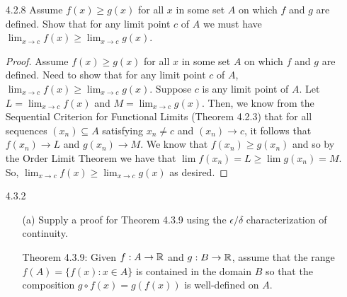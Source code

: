 \documentclass[12pt,letterpaper]{article}
\begin{document}
\begin{itemize}[leftmargin=!,labelindent=5pt]
\begin{itemize}
                    An example of such a limit would be $f(x) = x$ because $\lim_{x\to\infty} x = \infty$.

                    \begin{proof}
                        Suppose $N > 0$.
                        Need that there exists a $D > 0$ such that whenever $x \in A$ and $x > D$, it follows that $f(x) = x > N$.
                        Choose $D = N$.
                        Then, whenever $x \in A$ and $x > D$, it follows that $x > N$ as desired.
                    \end{proof}
            \end{itemize}
        \item [4.2.8] Assume $f(x) \geq g(x)$ for all $x$ in some set $A$ on which $f$ and $g$ are defined. Show that for any limit point $c$ of $A$ we must have $\lim_{x \to c} f(x) \geq \lim_{x \to c} g(x)$.
            \begin{proof}
                Assume $f(x) \geq g(x)$ for all $x$ in some set $A$ on which $f$ and $g$ are defined.
                Need to show that for any limit point $c$ of $A$, $\lim_{x \to c} f(x) \geq \lim_{x \to c} g(x)$.
                Suppose $c$ is any limit point of $A$.
                Let $ L = \lim_{x \to c} f(x)$ and $M = \lim_{x \to c} g(x)$.
                Then, we know from the Sequential Criterion for Functional Limits (Theorem 4.2.3) that for all sequences $(x_n) \subseteq A$ satisfying $x_n \neq c$ and $(x_n) \to c$, it follows that $f(x_n) \to L$ and $g(x_n) \to M$.
                We know that $f(x_n) \geq g(x_n)$ and so by the Order Limit Theorem we have that $\lim f(x_n) = L \geq \lim g(x_n) = M$.
                So, $\lim_{x \to c} f(x) \geq \lim_{x \to c} g(x)$ as desired.
            \end{proof}

        \item [4.3.2] 
            \begin{itemize}
                \item [(a)] Supply a proof for Theorem 4.3.9 using the $\epsilon / \delta$ characterization of continuity.
                    
                    Theorem 4.3.9: Given $f:A\to\mathbb{R}$ and $g:B\to\mathbb{R}$, assume that the range $f(A) = \{f(x): x \in A\}$ is contained in the domain $B$ so that the composition $g \circ f(x) = g(f(x))$ is well-defined on $A$.


\end{itemize}
\end{itemize}
\end{document}
